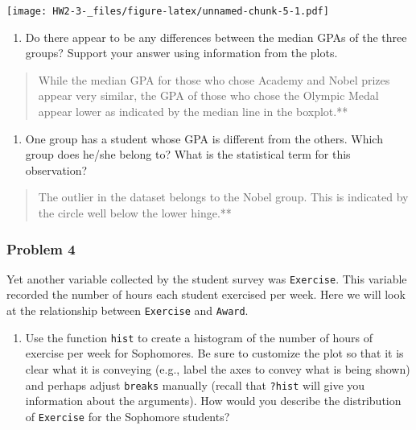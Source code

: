 \documentclass[]{article}
\newenvironment{Shaded}{\begin{snugshade}}{\end{snugshade}}
\newcommand{\KeywordTok}[1]{\textcolor[rgb]{0.13,0.29,0.53}{\textbf{#1}}}
\newcommand{\NormalTok}[1]{#1}
\newcommand{\OperatorTok}[1]{\textcolor[rgb]{0.81,0.36,0.00}{\textbf{#1}}}
\providecommand{\tightlist}{%
  \setlength{\itemsep}{0pt}\setlength{\parskip}{0pt}}
\begin{document}
\begin{Shaded}
\end{Shaded}

\texttt{[image: HW2-3-\_files/figure-latex/unnamed-chunk-5-1.pdf]}

\begin{enumerate}
\def\labelenumi{\roman{enumi}.}
\tightlist
\item
  Do there appear to be any differences between the median GPAs of the
  three groups? Support your answer using information from the plots.
\end{enumerate}

\begin{quote}
While the median GPA for those who chose Academy and Nobel prizes appear
very similar, the GPA of those who chose the Olympic Medal appear lower
as indicated by the median line in the boxplot.**
\end{quote}

\begin{enumerate}
\def\labelenumi{\roman{enumi}.}
\setcounter{enumi}{1}
\tightlist
\item
  One group has a student whose GPA is different from the others. Which
  group does he/she belong to? What is the statistical term for this
  observation?
\end{enumerate}

\begin{quote}
The outlier in the dataset belongs to the Nobel group. This is indicated
by the circle well below the lower hinge.**
\end{quote}

\hypertarget{problem-4}{%
\subsubsection{Problem 4}\label{problem-4}}

Yet another variable collected by the student survey was
\texttt{Exercise}. This variable recorded the number of hours each
student exercised per week. Here we will look at the relationship
between \texttt{Exercise} and \texttt{Award}.

\begin{enumerate}
\def\labelenumi{\alph{enumi})}
\tightlist
\item
  Use the function \texttt{hist} to create a histogram of the number of
  hours of exercise per week for Sophomores. Be sure to customize the
  plot so that it is clear what it is conveying (e.g., label the axes to
  convey what is being shown) and perhaps adjust \texttt{breaks}
  manually (recall that \texttt{?hist} will give you information about
  the arguments). How would you describe the distribution of
  \texttt{Exercise} for the Sophomore students?
\end{enumerate}
\end{document}
